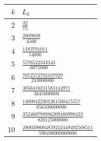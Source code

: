 \begin{tabular}{r@{\qquad}l}
\toprule
$k$ & $L_k$ \\
\midrule
2 & $\frac{32}{75}$ \\[1.2ex]
3 & $\frac{2009039}{4500}$ \\[1.2ex]
4 & $\frac{1183791011}{54000}$ \\[1.2ex]
5 & $\frac{5576522343343}{6075000}$ \\[1.2ex]
6 & $\frac{7072572702107929}{243000000}$ \\[1.2ex]
7 & $\frac{3056416241583144971}{3645000000}$ \\[1.2ex]
8 & $\frac{14000422301261560415557}{656100000000}$ \\[1.2ex]
9 & $\frac{352460798986209480998423}{820125000000}$ \\[1.2ex]
10 & $\frac{2800398004859242449492508511}{590490000000000}$ \\[1.2ex]
\bottomrule
\end{tabular}
